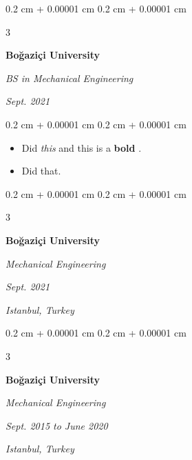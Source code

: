 \documentclass[10pt, letterpaper]{article}
\newenvironment{highlights}{
    \begin{itemize}[
        topsep=0.10 cm,
        parsep=0.10 cm,
        partopsep=0pt,
        itemsep=0pt,
        leftmargin=0.4 cm + 10pt + 0.6 cm
    ]
}{
    \end{itemize}
} %
\newenvironment{onecolentry}{
    \begin{adjustwidth}{
        0.2 cm + 0.00001 cm
    }{
        0.2 cm + 0.00001 cm
    }
}{
    \end{adjustwidth}
} %
\newenvironment{threecolentry}[3][]{
    \onecolentry
    \def\thirdColumn{#3}
    \setcolumnwidth{0.6 cm, \fill, 4.5 cm}
    \begin{paracol}{3}
    #2 \switchcolumn
}{
    \switchcolumn \raggedleft \thirdColumn
    \end{paracol}
    \endonecolentry
} %
\let\hrefWithoutArrow\href
\renewcommand{\href}[2]{\hrefWithoutArrow{#1}{\mbox{\ifthenelse{\equal{#2}{}}{ }{#2 }\raisebox{.15ex}{\footnotesize \faExternalLink*}}}}
\begin{document}
        \vspace{0.2 cm}

        \begin{threecolentry}{
            \vspace*{\fill}
            \textbullet
            \vspace*{3px}
            \vspace*{\fill}
        }{
        \textit{Sept. 2021}
            
        }
            \textbf{Boğaziçi University}

            \textit{BS in Mechanical Engineering}
        \end{threecolentry}

        \vspace{0.10 cm}
        \begin{onecolentry}
            \begin{highlights}
                \item Did \textit{this} and this is a \textbf{bold} \href{https://example.com}{link}.
                \item Did that.
            \end{highlights}
        \end{onecolentry}


        \vspace{0.2 cm}

        \begin{threecolentry}{
            \vspace*{\fill}
            \textbullet
            \vspace*{3px}
            \vspace*{\fill}
        }{
        \textit{Sept. 2021}
            
        \textit{Istanbul, Turkey}}
            \textbf{Boğaziçi University}

            \textit{Mechanical Engineering}
        \end{threecolentry}



        \vspace{0.2 cm}

        \begin{threecolentry}{
            \vspace*{\fill}
            \textbullet
            \vspace*{3px}
            \vspace*{\fill}
        }{
        \textit{Sept. 2015 to June 2020}
            
        \textit{Istanbul, Turkey}}
            \textbf{Boğaziçi University}

            \textit{Mechanical Engineering}
        \end{threecolentry}
\end{document}
